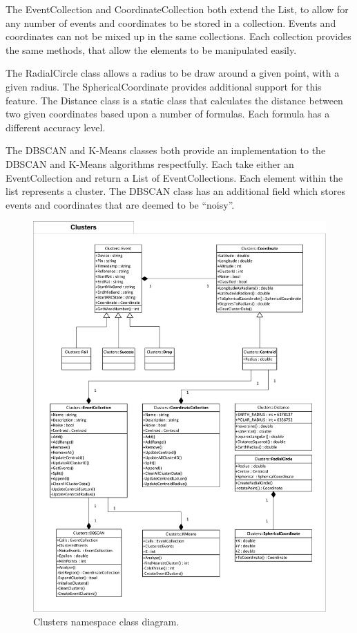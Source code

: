 The EventCollection and CoordinateCollection both extend the List, to allow for 
any number of events and coordinates to be stored in a collection. Events and 
coordinates can not be mixed up in the same collections. Each collection 
provides the same methods, that allow the elements to be manipulated easily.

The RadialCircle class allows a radius to be draw around a given point, with a 
given radius. The SphericalCoordinate provides additional support for this 
feature. The Distance class is a static class that calculates the distance 
between two given coordinates based upon a number of formulas. Each formula has 
a different accuracy level.

The DBSCAN and K-Means classes both provide an implementation to the DBSCAN and
K-Means algorithms respectfully. Each take either an EventCollection and return 
a List of EventCollections. Each element within the list represents a cluster. 
The DBSCAN class has an additional field which stores events and coordinates 
that are deemed to be ``noisy''.

\begin{figure}[H]
  \centering
    \includegraphics[scale=0.8]{chapter7/class_diagrams/clusters_namespace.png}
    \caption[Clusters namespace class diagram]
            {Clusters namespace class diagram.}
    \label{fig:NSClusters}
\end{figure}


